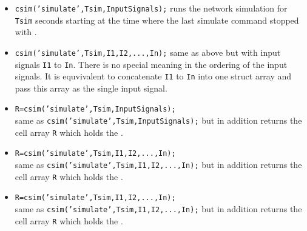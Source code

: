 \begin{itemize}
  
\item \texttt{csim('simulate',Tsim,InputSignals);} runs the network
  simulation for \texttt{Tsim} seconds starting at the time where the
  last simulate command stopped with .
  
\item \texttt{csim('simulate',Tsim,I1,I2,...,In);} same as above but
  with input signals \texttt{I1} to \texttt{In}. There is no special
  meaning in the ordering of the input signals. It is equvivalent to
  concatenate \texttt{I1} to \texttt{In} into one struct array and
  pass this array as the single input signal.
  
\item \texttt{R=csim('simulate',Tsim,InputSignals);}\\ same as
  \texttt{csim('simulate',Tsim,InputSignals);} but in addition returns
  the cell array \texttt{R} which holds the .
  
\item \texttt{R=csim('simulate',Tsim,I1,I2,...,In);}\\ same as
  \texttt{csim('simulate',Tsim,I1,I2,...,In);} but in addition returns
  the cell array \texttt{R} which holds the .

\item \texttt{R=csim('simulate',Tsim,I1,I2,...,In);}\\ same as
  \texttt{csim('simulate',Tsim,I1,I2,...,In);} but in addition returns
  the cell array \texttt{R} which holds the .


\end{itemize}

%
%
%
%  
%
%


